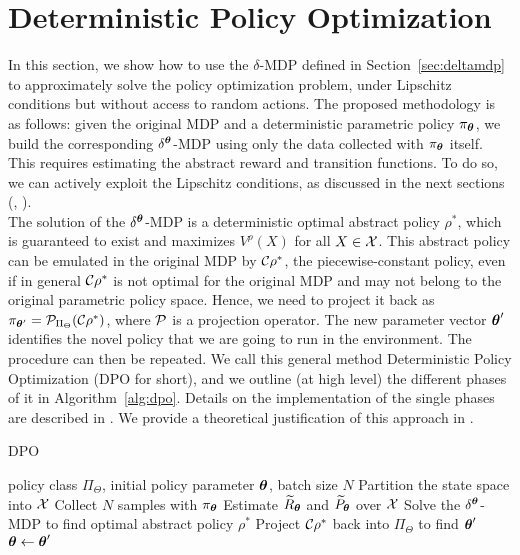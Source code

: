 \section{Deterministic Policy Optimization}\label{sec:algo}
In this section, we show how to use the $\delta$-\ac{MDP} defined in Section~\ref{sec:deltamdp} to approximately solve the policy optimization problem, under Lipschitz conditions but without access to random actions.
%
The proposed methodology is as follows: given the original \ac{MDP} and a deterministic parametric policy $\pi_{\boldsymbol{\theta}}$, we build the corresponding  $\delta^{\boldsymbol{\theta}}$-\ac{MDP} using only the data collected with $\pi_{\boldsymbol{\theta}}$ itself. This requires estimating the abstract reward and transition functions. To do so, we can actively exploit the Lipschitz conditions, as discussed in the next sections (, ).\\
\newline
The solution of the $\delta^{\boldsymbol{\theta}}$-\ac{MDP} is a deterministic optimal abstract policy $\rho^{*}$, which is guaranteed to exist and maximizes $V^{\rho}(X)$ for all $X\in\mathcal{X}$. This abstract policy can be emulated in the original \ac{MDP} by $\mathcal{C}\rho^{*}$, the piecewise-constant policy, even if in general $\mathcal{C}\rho^{*}$ is not optimal for the original \ac{MDP} and may not belong to the original parametric policy space. Hence, we need to project it back as $\pi_{\boldsymbol{\theta}'} = \mathcal{P}_{\Pi_{\Theta}}(\mathcal{C}\rho^{*})$, where $\mathcal{P}$ is a projection operator. The new parameter vector $\boldsymbol{\theta}'$ identifies the novel policy that we are going to run in the environment. The procedure can then be repeated. We call this general method Deterministic Policy Optimization (\ac{DPO} for short), and we outline (at high level) the different phases of it in Algorithm~\ref{alg:dpo}. Details on the implementation of the single phases are described in .
We provide a theoretical justification of this approach in .
%
%
\begin{algorithm}[t]
	\caption{DPO}
	\label{alg:dpo}
	\begin{algorithmic}[1]
		 policy class $\Pi_{\Theta}$, initial policy parameter $\boldsymbol{\theta}$, batch size $N$
		\STATE Partition the state space into $\mathcal{X}$
		\STATE Collect $N$ samples with $\pi_{\boldsymbol{\theta}}$ 
		\STATE Estimate $\widetilde{R}_{\boldsymbol{\theta}}$ and $\widetilde{P}_{\boldsymbol{\theta}}$ over $\mathcal{X}$
		\STATE Solve the $\delta^{\boldsymbol{\theta}}$-MDP to find optimal abstract policy $\rho^{*}$
		\STATE Project $\mathcal{C}\rho^{*}$ back into $\Pi_{\Theta}$ to find $\boldsymbol{\theta}'$
		\STATE $\boldsymbol{\theta}\gets\boldsymbol{\theta}'$
		\ENDFOR
	\end{algorithmic}
\end{algorithm}
%

